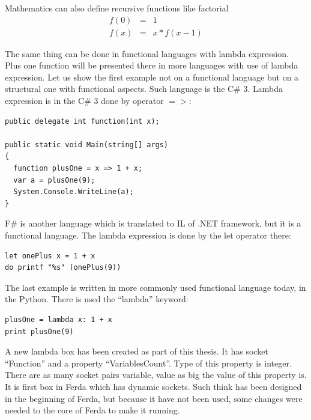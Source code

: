 \documentclass[a4paper,12pt]{book}
\begin{document}
Mathematics can also define recursive functions like factorial
\begin{eqnarray*}
f(0)&=&1\\
f(x)&=&x * f(x - 1)
\end{eqnarray*}

The same thing can be done in functional languages with lambda expression. Plus one function will be presented there in more languages with use of lambda expression. Let us show the first example not on a functional language but on a structural one with functional aspects. Such language is the C\# 3. Lambda expression is in the C\# 3 done by operator $=>$:

\begin{verbatim}
public delegate int function(int x);

public static void Main(string[] args)
{
  function plusOne = x => 1 + x;
  var a = plusOne(9);
  System.Console.WriteLine(a);
}
\end{verbatim}

F\# is another language which is translated to IL of .NET framework, but it is a functional language. The lambda expression is done by the let operator there:
\begin{verbatim}
let onePlus x = 1 + x
do printf "%s" (onePlus(9)) 
\end{verbatim}

The last example is written in more commonly used functional language today, in the Python. There is used the ``lambda'' keyword:
\begin{verbatim}
plusOne = lambda x: 1 + x
print plusOne(9)
\end{verbatim}

A new lambda box has been created as part of this thesis. It has socket ``Function'' and a property ``VariablesCount''. Type of this property is integer. There are as many socket pairs variable, value as big the value of this property is. It is first box in Ferda which has dynamic sockets. Such think has been designed in the beginning of Ferda, but because it have not been used, some changes were needed to the core of Ferda to make it running.
\end{document}
